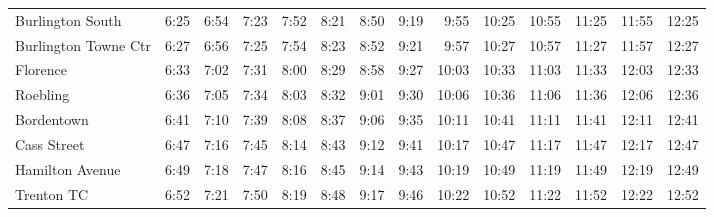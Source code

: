 \begin{center}
\begin{tabular}{@{}lrrrrrrrrrrrrr@{}}
Burlington South & 6:25 & 6:54 & 7:23 & 7:52 & 8:21 & 8:50 & 9:19 & 9:55 & 10:25 & 10:55 & 11:25 & 11:55 & 12:25 \\
Burlington Towne Ctr & 6:27 & 6:56 & 7:25 & 7:54 & 8:23 & 8:52 & 9:21 & 9:57 & 10:27 & 10:57 & 11:27 & 11:57 & 12:27 \\
Florence & 6:33 & 7:02 & 7:31 & 8:00 & 8:29 & 8:58 & 9:27 & 10:03 & 10:33 & 11:03 & 11:33 & 12:03 & 12:33 \\
Roebling & 6:36 & 7:05 & 7:34 & 8:03 & 8:32 & 9:01 & 9:30 & 10:06 & 10:36 & 11:06 & 11:36 & 12:06 & 12:36 \\
Bordentown & 6:41 & 7:10 & 7:39 & 8:08 & 8:37 & 9:06 & 9:35 & 10:11 & 10:41 & 11:11 & 11:41 & 12:11 & 12:41 \\
Cass Street & 6:47 & 7:16 & 7:45 & 8:14 & 8:43 & 9:12 & 9:41 & 10:17 & 10:47 & 11:17 & 11:47 & 12:17 & 12:47 \\
Hamilton Avenue & 6:49 & 7:18 & 7:47 & 8:16 & 8:45 & 9:14 & 9:43 & 10:19 & 10:49 & 11:19 & 11:49 & 12:19 & 12:49 \\
Trenton TC & 6:52 & 7:21 & 7:50 & 8:19 & 8:48 & 9:17 & 9:46 & 10:22 & 10:52 & 11:22 & 11:52 & 12:22 & 12:52 \\
\bottomrule\end{tabular}\end{center}
